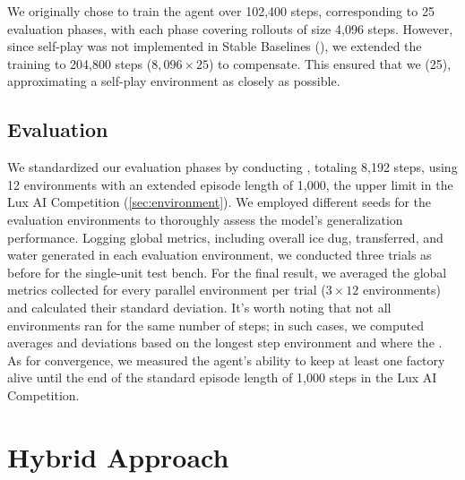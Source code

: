 \bigskip

\noindent We originally chose to train the agent over 102,400 steps, corresponding to 25 evaluation phases, with each phase covering rollouts of size 4,096 steps. However, since self-play was not implemented in Stable Baselines (\cite{stable-baselines-issue181}), we extended the training to 204,800 steps ($8,096 \times 25$) to compensate. This ensured that we  (25), approximating a self-play environment as closely as possible.

\subsection{Evaluation}
\label{sec:monolithic-approach-eval}

\noindent We standardized our evaluation phases by conducting , totaling 8,192 steps, using 12 environments with an extended episode length of 1,000, the upper limit in the Lux AI Competition (\autoref{sec:environment}). We employed different seeds for the evaluation environments to thoroughly assess the model's generalization performance. Logging global metrics, including overall ice dug, transferred, and water generated in each evaluation environment, we conducted three trials as before for the single-unit test bench. For the final result, we averaged the global metrics collected for every parallel environment per trial ($3\times12$ environments) and calculated their standard deviation. It's worth noting that not all environments ran for the same number of steps; in such cases, we computed averages and deviations based on the longest step environment and  where the . As for convergence, we measured the agent's ability to keep at least one factory alive until the end of the standard episode length of 1,000 steps in the Lux AI Competition.

\section{Hybrid Approach}
\label{sec:hybrid-approach}

